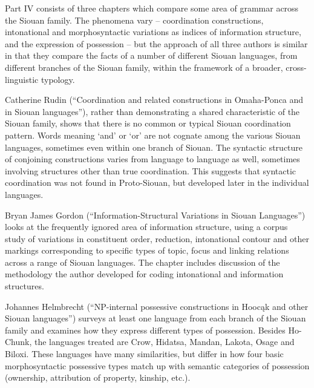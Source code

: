 \begin{refsection}

Part IV consists of three chapters which compare some area of grammar across the Siouan family. The phenomena vary -- coordination constructions, intonational and morphosyntactic variations as indices of information structure, and the expression of possession -- but the approach of all three authors is similar in that they compare the facts of a number of different Siouan languages, from different branches of the Siouan family, within the framework of a broader, cross-linguistic typology.

Catherine Rudin (``Coordination and related constructions in Omaha-Ponca and in Siouan languages''), rather than demonstrating a shared characteristic of the Siouan family, shows that there is no common or typical Siouan coordination pattern. Words meaning `and' or `or' are not cognate among the various Siouan languages, sometimes even within one branch of Siouan. The syntactic structure of conjoining constructions varies from language to language as well, sometimes involving structures other than true coordination. This suggests that syntactic coordination was not found in Proto-Siouan, but developed later in the individual languages.

Bryan James Gordon (``Information-Structural Variations in Siouan Languages'') looks at the frequently ignored area of information structure, using a corpus study of variations in constituent order, reduction, intonational contour and other markings corresponding to specific types of topic, focus and linking relations across a range of Siouan languages. The chapter includes discussion of the methodology the author developed for coding intonational and information structures.


Johannes Helmbrecht (``NP-internal possessive constructions in Hooc\k{a}k and other Siouan languages'') surveys at least one language from each branch of the Siouan family and examines how they express different types of possession. Besides Ho-Chunk, the languages treated are Crow, Hidatsa, Mandan, Lakota, Osage and Biloxi. These languages have many similarities, but differ in how four basic morphosyntactic possessive types match up with semantic categories of possession (ownership, attribution of property, kinship, etc.).


 
\end{refsection}

